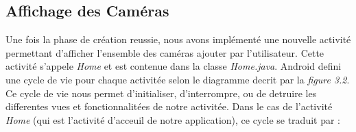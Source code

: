 \subsection{Affichage des Caméras}
Une fois la phase de création reussie, nous avons implémenté une nouvelle
activité permettant d'afficher l'ensemble des caméras ajouter par l'utilisateur.
Cette activité s'appele \textit{Home} et est contenue dans la classe
\textit{Home.java}.\newline
Android defini une cycle de vie pour chaque activitée selon le diagramme
decrit par la \textit{figure 3.2}.
\newline
\indent Ce cycle de vie nous permet d'initialiser, d'interrompre, ou de detruire
les differentes vues et fonctionnalitées de notre activitée. Dans le cas de
l'activité \textit{Home} (qui est l'activité d'acceuil de notre application), ce cycle se traduit par : 
